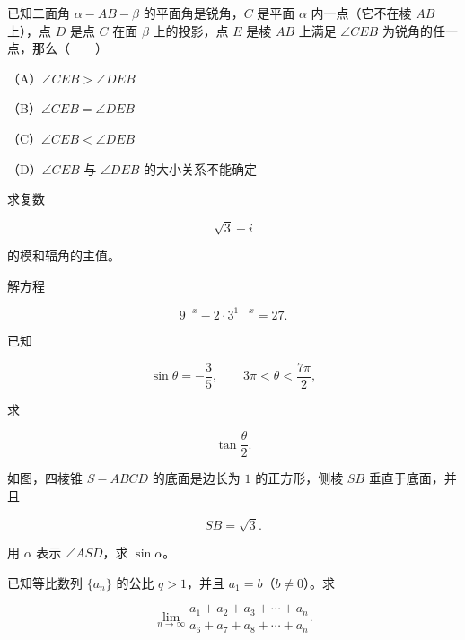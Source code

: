 \begin{question}
已知二面角 $\alpha-AB-\beta$ 的平面角是锐角，$C$ 是平面 $\alpha$ 内一点（它不在棱 $AB$ 上），点 $D$ 是点 $C$ 在面 $\beta$ 上的投影，点 $E$ 是棱 $AB$ 上满足 $\angle CEB$ 为锐角的任一点，那么\mbox{（　　）}

（A）$\angle CEB>\angle DEB$

（B）$\angle CEB=\angle DEB$

（C）$\angle CEB<\angle DEB$

（D）$\angle CEB$ 与 $\angle DEB$ 的大小关系不能确定

\end{question}
\begin{question}
求复数

\nopagebreak[4]
\[
\sqrt3-i
\]

的模和辐角的主值。

\end{question}
\begin{question}
解方程

\nopagebreak[4]
\[
9^{-x}-2\cdot3^{1-x}=27.
\]

\end{question}
\begin{question}
已知

\nopagebreak[4]
\[
\sin\theta=-\frac35,\qquad
3\pi<\theta<\frac{7\pi}{2},
\]

求

\nopagebreak[4]
\[
\tan\frac\theta2.
\]

\Needspace{0.4\textheight}
\end{question}
\begin{question}
如图，四棱锥 $S-ABCD$ 的底面是边长为 $1$ 的正方形，侧棱 $SB$ 垂直于底面，并且

\nopagebreak[4]
\[
SB=\sqrt3.
\]

用 $\alpha$ 表示 $\angle ASD$，求 $\sin\alpha$。
\nopagebreak[4]
\begin{center}\end{center}
\nopagebreak[4]
\end{question}
\begin{question}
已知等比数列 $\{a_n\}$ 的公比 $q>1$，并且 $a_1=b$（$b\ne0$）。求

\nopagebreak[4]
\[
\lim_{n\to\infty}
\frac{a_1+a_2+a_3+\cdots+a_n}
{a_6+a_7+a_8+\cdots+a_n}.
\]

\end{question}
